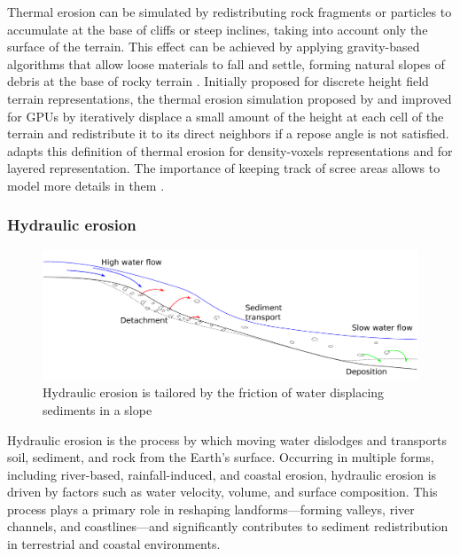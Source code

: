 Thermal erosion can be simulated by redistributing rock fragments or particles to accumulate at the base of cliffs or steep inclines, taking into account only the surface of the terrain. This effect can be achieved by applying gravity-based algorithms that allow loose materials to fall and settle, forming natural slopes of debris at the base of rocky terrain \cite{Musgrave1989,Jones2010}. Initially proposed for discrete height field terrain representations, the thermal erosion simulation proposed by \citep{Musgrave1989} and improved for GPUs by \cite{Jako2011} iteratively displace a small amount of the height at each cell of the terrain and redistribute it to its direct neighbors if a repose angle is not satisfied. \citep{Jones2010} adapts this definition of thermal erosion for density-voxels representations and \citep{Benes2001} for layered representation. The importance of keeping track of scree areas allows to model more details in them \cite{Peytavie2009a,Paris2020}. 



\subsubsection{Hydraulic erosion}
\begin{figure}[h]
    \centering
    \includegraphics[width = 0.8 \linewidth]{hydraulic_erosion.pdf}
    \caption{Hydraulic erosion is tailored by the friction of water displacing sediments in a slope}
    \label{fig:erosion_hydraulic-erosion}
\end{figure}


Hydraulic erosion is the process by which moving water dislodges and transports soil, sediment, and rock from the Earth's surface. Occurring in multiple forms, including river-based, rainfall-induced, and coastal erosion, hydraulic erosion is driven by factors such as water velocity, volume, and surface composition. This process plays a primary role in reshaping landforms—forming valleys, river channels, and coastlines—and significantly contributes to sediment redistribution in terrestrial and coastal environments.


